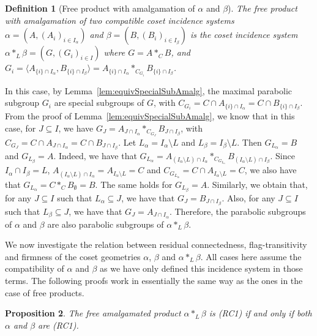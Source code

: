 \documentclass[11pt,letterpaper]{amsart}
\newtheorem{prop}{Proposition}[section]
\newtheorem{definition}[prop]{Definition}
\begin{document}
\begin{definition}[Free product with amalgamation of $\alpha$ and $\beta$]
    The free product with amalgamation of two compatible coset incidence systems $\alpha = (A, (A_i)_{i \in I_\alpha})$ and $ \beta =(B, (B_i)_{i \in I_\beta})$ is the coset incidence system $\alpha *_L \beta = (G,(G_i)_{i \in I})$ where $G = A *_{C} B$, and $G_i = \langle A_{\{i\} \cap I_\alpha} , B_{ \{i\} \cap I_\beta}\rangle = A_{\{i\} \cap I_\alpha} *_{C_{G_i}} B_{ \{i\} \cap I_\beta}$.
\end{definition}
  In this case, by Lemma~\ref{lem:equivSpecialSubAmalg}, the maximal parabolic subgroup $G_i$ are special subgroups of $G$, with $C_{G_i}=C\cap A_{\{i\} \cap I_\alpha} = C \cap B_{ \{i\} \cap I_\beta}$. From the proof of Lemma~\ref{lem:equivSpecialSubAmalg}, we know that in this case, for $J\subseteq I$, we have 
$G_J = A_{J\cap I_\alpha} *_{C_{G_J}} B_{J\cap I_\beta}$, with $C_{G_J}= C \cap A_{J\cap I_\alpha} = C \cap B_{J\cap I_\beta}$.
Let $L_\alpha = I_\alpha \setminus L$ and $L_\beta = I_\beta \setminus L$. Then $G_{L_\alpha} = B$ and $G_{L_\beta} = A$. Indeed, we have that $G_{L_\alpha} = A_{(I_\alpha\setminus L)\cap I_\alpha} *_{C_{G_{L_\alpha}}} B_{(I_\alpha\setminus L)\cap I_\beta}$. Since $I_\alpha\cap I_\beta=L$, $A_{(I_\alpha\setminus L)\cap I_\alpha}= A_{I_\alpha\setminus L}=C$ and $C_{G_{L_\alpha}}= C\cap A_{I_\alpha\setminus L}=C$, we also have that  $G_{L_\alpha} = C *_{C} B_{\emptyset} = B$. The same holds for $G_{L_\beta} = A$. Similarly, we obtain that, for any $J \subseteq I$ such that $L_\alpha \subseteq J$, we have that $G_J = B_{J \cap I_\beta}$. Also, for any $J \subseteq I$ such that $L_\beta \subseteq J$, we have that $G_J = A_{J \cap I_\alpha}$. Therefore, the parabolic subgroups of $\alpha$ and $\beta$ are also parabolic subgroups of $\alpha *_L \beta$.

We now investigate the relation between residual connectedness, flag-transitivity and firmness of the coset geometries $\alpha$, $\beta$ and $\alpha *_L \beta$. All cases here assume the compatibility of $\alpha$ and $\beta$ as we have only defined this incidence system in those terms.
The following proofs work in essentially the same way as the ones in the case of free products.

\begin{prop}\label{prop:RC_FPAmalg}
    The free amalgamated product $\alpha *_L \beta$ is (RC1) if and only if both $\alpha$ and $\beta$ are (RC1).
\end{prop}
\end{document}
